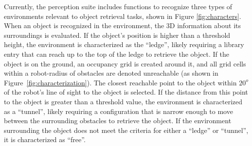 \documentclass[conference]{IEEEtran}
\begin{document}

Currently, the perception suite includes functions to recognize three types of environments relevant to object retrieval tasks, shown in Figure \ref{fig:characters}.  When an object is recognized in the environment, the 3D information about its surroundings is evaluated. If the object's position is higher than a threshold height, the environment is characterized as the ``ledge'', likely requiring a library entry that can reach up to the top of the ledge to retrieve the object.
If the object is on the ground, an occupancy grid is created around it, and all grid cells within a robot-radius of obstacles are denoted unreachable (as shown in Figure~\ref{fig:characterization}). The closest reachable point to the object within $20^o$ of the robot's line of sight to the object is selected. If the distance from this point to the object is greater than a threshold value, the environment is characterized as a ``tunnel'', likely requiring a configuration that is narrow enough to move between the surrounding obstacles to retrieve the object.
If the environment surrounding the object does not meet the criteria for either a ``ledge'' or ``tunnel'', it is characterized as ``free''.
%
\end{document}
